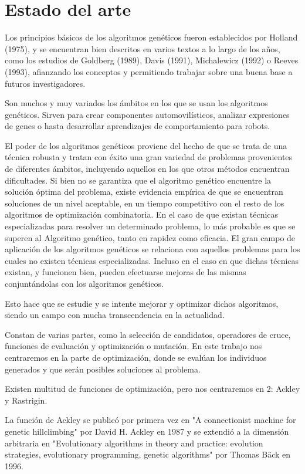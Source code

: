 \chapter{Estado del arte}
\bigskip

Los principios básicos de los algoritmos genéticos fueron establecidos por Holland (1975), y se encuentran bien descritos en varios textos a lo largo de los años, como los estudios de Goldberg (1989), Davis (1991), Michalewicz (1992) o Reeves (1993), afianzando los conceptos y permitiendo trabajar sobre una buena base a futuros investigadores.

\bigskip
Son muchos y muy variados los ámbitos en los que se usan los algoritmos genéticos. Sirven para crear componentes automovilísticos, analizar expresiones de genes o hasta desarrollar aprendizajes de comportamiento para robots.

\bigskip
El poder de los algoritmos genéticos proviene del hecho de que se trata de una técnica robusta y tratan con éxito una gran variedad de problemas provenientes de diferentes ámbitos, incluyendo aquellos en los que otros métodos encuentran dificultades. Si bien no se garantiza que el algoritmo genético encuentre la solución óptima del problema, existe evidencia empírica de que se encuentran soluciones de un nivel aceptable, en un tiempo competitivo con el resto de los algoritmos de optimización combinatoria. En el caso de que existan técnicas especializadas para resolver un determinado problema, lo más probable es que se superen al Algoritmo genético, tanto en rapidez como eficacia. El gran campo de aplicación de los algoritmos genéticos se relaciona con aquellos problemas para los cuales no existen técnicas especializadas. Incluso en el caso en que dichas técnicas existan, y funcionen bien, pueden efectuarse mejoras de las mismas conjuntándolas con los algoritmos genéticos.

Esto hace que se estudie y se intente mejorar y optimizar dichos algoritmos, siendo un campo con mucha transcendencia en la actualidad.

\bigskip
Constan de varias partes, como la selección de candidatos, operadores de cruce, funciones de evaluación y optimización o mutación. En este trabajo nos centraremos en la parte de optimización, donde se evalúan los individuos generados y que serán posibles soluciones al problema.

Existen multitud de funciones de optimización, pero nos centraremos en 2: Ackley y Rastrigin.

\bigskip
La función de Ackley se publicó por primera vez en "A connectionist machine for genetic hillclimbing" por David H. Ackley en 1987 y se extendió a la dimensión arbitraria en "Evolutionary algorithms in theory and practice: evolution strategies, evolutionary programming, genetic algorithms" por Thomas Bäck en 1996.

